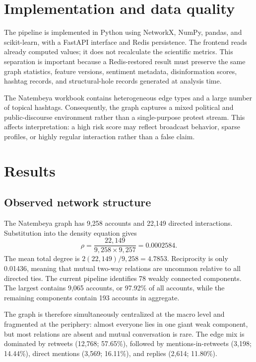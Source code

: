 \documentclass[11pt]{article}
\begin{document}
\section{Implementation and data quality}

The pipeline is implemented in Python using NetworkX, NumPy, pandas, and scikit-learn, with a FastAPI interface and Redis persistence. The frontend reads already computed values; it does not recalculate the scientific metrics. This separation is important because a Redis-restored result must preserve the same graph statistics, feature versions, sentiment metadata, disinformation scores, hashtag records, and structural-hole records generated at analysis time.

The Natembeya workbook contains heterogeneous edge types and a large number of topical hashtags. Consequently, the graph captures a mixed political and public-discourse environment rather than a single-purpose protest stream. This affects interpretation: a high risk score may reflect broadcast behavior, sparse profiles, or highly regular interaction rather than a false claim.

\section{Results}

\subsection{Observed network structure}
The Natembeya graph has 9,258 accounts and 22,149 directed interactions. Substitution into the density equation gives
\[
\rho=\frac{22,149}{9,258\times9,257}=0.0002584.
\]
The mean total degree is $2(22,149)/9,258=4.7853$. Reciprocity is only 0.01436, meaning that mutual two-way relations are uncommon relative to all directed ties. The current pipeline identifies 78 weakly connected components. The largest contains 9,065 accounts, or 97.92\% of all accounts, while the remaining components contain 193 accounts in aggregate.

The graph is therefore simultaneously centralized at the macro level and fragmented at the periphery: almost everyone lies in one giant weak component, but most relations are absent and mutual conversation is rare. The edge mix is dominated by retweets (12,768; 57.65\%), followed by mentions-in-retweets (3,198; 14.44\%), direct mentions (3,569; 16.11\%), and replies (2,614; 11.80\%).
\end{document}
